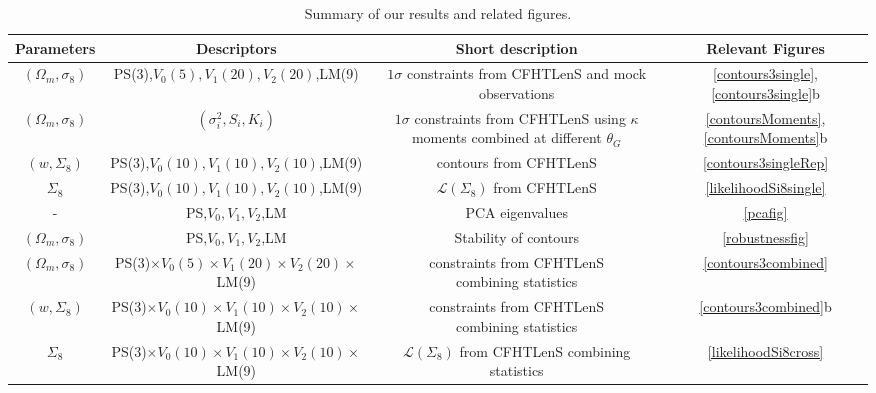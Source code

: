 \documentclass[reprint,aps,prd,superscriptaddress,showkeys,showpacs]{revtex4-1}
\begin{document}
\begin{table*}
\begin{tabular}{c|c|c||c}
Parameters & Descriptors & Short description & Relevant Figures \\ \hline \hline
$(\Omega_m,\sigma_8)$ & PS(3),$V_0(5),V_1(20),V_2(20)$,LM(9) &\pbox{20cm}{$1\sigma$ constraints from CFHTLenS \\ and mock observations}  & \ref{contours3single},\ref{contours3single}b \\ \hline
$(\Omega_m,\sigma_8)$ & $(\sigma_i^2,S_i,K_i)$ & \pbox{20cm}{$1\sigma$ constraints from CFHTLenS \\ using $\kappa$ moments \\ combined at different $\theta_G$}  & \ref{contoursMoments},\ref{contoursMoments}b \\ \hline
$(w,\Sigma_8)$ & PS(3),$V_0(10),V_1(10),V_2(10)$,LM(9) & contours from CFHTLenS & \ref{contours3singleRep} \\ \hline 
$\Sigma_8$ & PS(3),$V_0(10),V_1(10),V_2(10)$,LM(9) & $\mathcal{L}(\Sigma_8)$ from CFHTLenS & \ref{likelihoodSi8single} \\ \hline
- & PS,$V_0,V_1,V_2$,LM & PCA eigenvalues  & \ref{pcafig} \\ \hline
$(\Omega_m,\sigma_8)$ & PS,$V_0,V_1,V_2$,LM & Stability of contours & \ref{robustnessfig} \\ \hline 
$(\Omega_m,\sigma_8)$ & PS(3)$\times V_0(5)\times V_1(20)\times V_2(20)\times$LM(9) & \pbox{20cm}{constraints from CFHTLenS \\ combining statistics} & \ref{contours3combined} \\ \hline
$(w,\Sigma_8)$ & PS(3)$\times V_0(10)\times V_1(10)\times V_2(10)\times$LM(9) & \pbox{20cm}{constraints from CFHTLenS \\ combining statistics} & \ref{contours3combined}b \\ \hline 
$\Sigma_8$ & PS(3)$\times V_0(10)\times V_1(10)\times V_2(10)\times$LM(9) & \pbox{20cm}{$\mathcal{L}(\Sigma_8)$ from CFHTLenS \\ combining statistics} & \ref{likelihoodSi8cross} \\ \hline
\end{tabular}
\caption{Summary of our results and related figures.}
\label{summarytable}
\end{table*}
\end{document}
